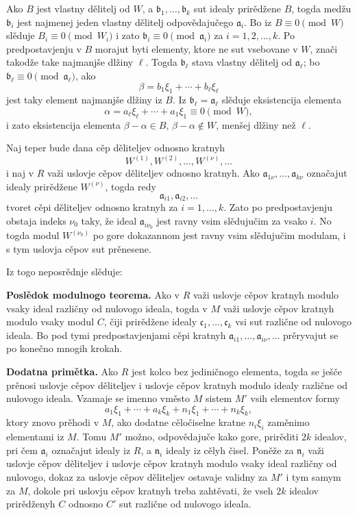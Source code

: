 \documentclass[11pt]{article}
\begin{document}
Ako $B$ jest vlastny dělitelj od $W$, a $\mathfrak b_1,\ldots,\mathfrak b_k$ sut idealy prirědžene $B$, togda medžu $\mathfrak b_i$ jest najmenej jeden vlastny dělitelj odpovědajučego $\mathfrak a_i$. Bo iz $B\equiv0\pmod W$ slěduje $B_i\equiv0\pmod {W_i}$ i zato $\mathfrak b_i\equiv0\pmod{\mathfrak a_i}$ za $i=1,2,\ldots,k$. Po predpostavjenju v $B$ morajut byti elementy, ktore ne sut vsebovane v $W$, znači takodže take najmanjše dlžiny $\ell$. Togda $\mathfrak b_\ell$ stava vlastny dělitelj od $\mathfrak a_\ell$; bo $\mathfrak b_\ell\equiv0\pmod{\mathfrak a_\ell}$, ako
\[
        \beta=b_1\xi_1+\cdots+b_\ell\xi_\ell
\]
jest taky element najmanjše dlžiny iz $B$. Iz $\mathfrak b_\ell=\mathfrak a_\ell$ slěduje eksistencija elementa
\[
        \alpha=a_\ell\xi_\ell+\cdots+a_1\xi_1\equiv0\pmod W,
\]
i zato eksistencija elementa $\beta-\alpha\in B$, $\beta-\alpha\notin W$, menšej dlžiny než $\ell$.

Naj teper bude dana cěp děliteljev odnosno kratnyh
\[
        W^{(1)},W^{(2)},\ldots,W^{(\nu)},\ldots
\]
i naj v $R$ važi uslovje cěpov děliteljev odnosno kratnyh. Ako $\mathfrak a_{1\nu},\ldots,\mathfrak a_{k\nu}$ označajut idealy prirědžene $W^{(\nu)}$, togda redy
\[
        \mathfrak a_{i1},\mathfrak a_{i2},\ldots
\]
tvoret cěpi děliteljev odnosno kratnyh za $i=1,\ldots,k$. Zato po predpostavjenju obstaja indeks $\nu_0$ taky, že ideal $\mathfrak a_{i\nu_0}$ jest ravny vsim slědujučim za vsako $i$. No togda modul $W^{(\nu_0)}$ po gore dokazannom jest ravny vsim slědujučim modulam, i s tym uslovja cěpov sut prěnesene.

Iz togo neposrědnje slěduje:

\medskip
\noindent\textbf{Poslědok modulnogo teorema.} Ako v $R$ važi uslovje cěpov kratnyh modulo vsaky ideal različny od nulovogo ideala, togda v $M$ važi uslovje cěpov kratnyh modulo vsaky modul $C$, čiji prirědžene idealy $\mathfrak c_1,\ldots,\mathfrak c_k$ vsi sut različne od nulovogo ideala. Bo pod tymi predpostavjenjami cěpi kratnyh $\mathfrak a_{i1},\ldots,\mathfrak a_{i\nu},\ldots$ prěryvajut se po konečno mnogih krokah.

\medskip
\noindent\textbf{Dodatna primětka.} Ako $R$ jest kolco bez jediničnogo elementa, togda se ješče prěnosi uslovje cěpov děliteljev i uslovje cěpov kratnyh modulo idealy različne od nulovogo ideala. Vzamaje se imenno vměsto $M$ sistem $M'$ vsih elementov formy
\[
        a_1\xi_1+\cdots+a_k\xi_k+n_1\xi_1+\cdots+n_k\xi_k,
\]
ktory znovo prěhodi v $M$, ako dodatne cěločiselne kratne $n_i\xi_i$ zaměnimo elementami iz $M$. Tomu $M'$ možno, odpovědajuče kako gore, prirěditi $2k$ idealov, pri čem $\mathfrak a_i$ označajut idealy iz $R$, a $\mathfrak n_i$ idealy iz cělyh čisel. Poněže za $\mathfrak n_i$ važi uslovje cěpov děliteljev i uslovje cěpov kratnyh modulo vsaky ideal različny od nulovogo, dokaz za uslovje cěpov děliteljev ostavaje validny za $M'$ i tym samym za $M$, dokole pri uslovju cěpov kratnyh treba zahtěvati, že vseh $2k$ idealov prirědženyh $C$ odnosno $C'$ sut različne od nulovogo ideala.
\end{document}
